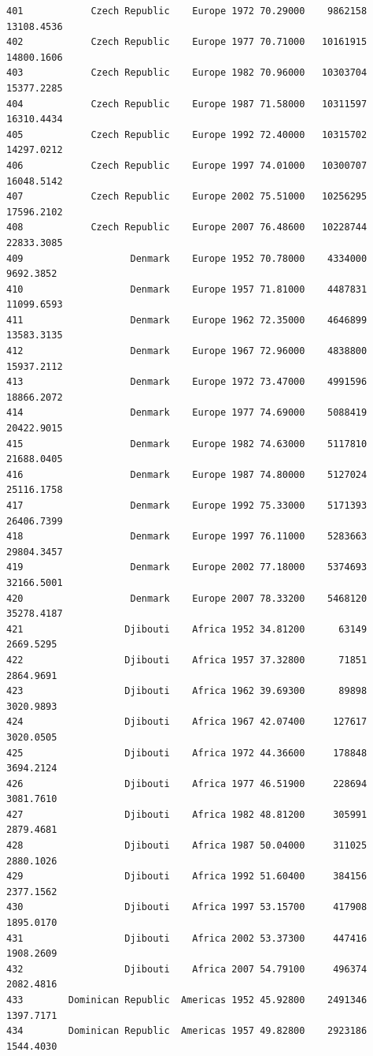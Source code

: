 \documentclass[
  letterpaper,
  DIV=11,
  numbers=noendperiod]{scrreprt}
\begin{document}
\begin{verbatim}
401            Czech Republic    Europe 1972 70.29000    9862158  13108.4536
402            Czech Republic    Europe 1977 70.71000   10161915  14800.1606
403            Czech Republic    Europe 1982 70.96000   10303704  15377.2285
404            Czech Republic    Europe 1987 71.58000   10311597  16310.4434
405            Czech Republic    Europe 1992 72.40000   10315702  14297.0212
406            Czech Republic    Europe 1997 74.01000   10300707  16048.5142
407            Czech Republic    Europe 2002 75.51000   10256295  17596.2102
408            Czech Republic    Europe 2007 76.48600   10228744  22833.3085
409                   Denmark    Europe 1952 70.78000    4334000   9692.3852
410                   Denmark    Europe 1957 71.81000    4487831  11099.6593
411                   Denmark    Europe 1962 72.35000    4646899  13583.3135
412                   Denmark    Europe 1967 72.96000    4838800  15937.2112
413                   Denmark    Europe 1972 73.47000    4991596  18866.2072
414                   Denmark    Europe 1977 74.69000    5088419  20422.9015
415                   Denmark    Europe 1982 74.63000    5117810  21688.0405
416                   Denmark    Europe 1987 74.80000    5127024  25116.1758
417                   Denmark    Europe 1992 75.33000    5171393  26406.7399
418                   Denmark    Europe 1997 76.11000    5283663  29804.3457
419                   Denmark    Europe 2002 77.18000    5374693  32166.5001
420                   Denmark    Europe 2007 78.33200    5468120  35278.4187
421                  Djibouti    Africa 1952 34.81200      63149   2669.5295
422                  Djibouti    Africa 1957 37.32800      71851   2864.9691
423                  Djibouti    Africa 1962 39.69300      89898   3020.9893
424                  Djibouti    Africa 1967 42.07400     127617   3020.0505
425                  Djibouti    Africa 1972 44.36600     178848   3694.2124
426                  Djibouti    Africa 1977 46.51900     228694   3081.7610
427                  Djibouti    Africa 1982 48.81200     305991   2879.4681
428                  Djibouti    Africa 1987 50.04000     311025   2880.1026
429                  Djibouti    Africa 1992 51.60400     384156   2377.1562
430                  Djibouti    Africa 1997 53.15700     417908   1895.0170
431                  Djibouti    Africa 2002 53.37300     447416   1908.2609
432                  Djibouti    Africa 2007 54.79100     496374   2082.4816
433        Dominican Republic  Americas 1952 45.92800    2491346   1397.7171
434        Dominican Republic  Americas 1957 49.82800    2923186   1544.4030

\end{verbatim}
\end{document}
